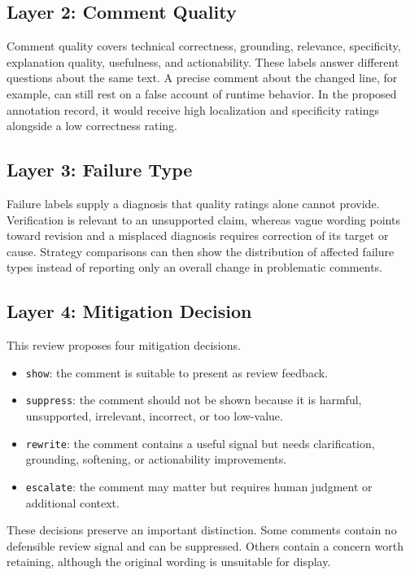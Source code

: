 \documentclass[10pt]{article}
\begin{document}
\subsection{Layer 2: Comment Quality}

Comment quality covers technical correctness, grounding, relevance, specificity, explanation quality, usefulness, and actionability. These labels answer different questions about the same text. A precise comment about the changed line, for example, can still rest on a false account of runtime behavior. In the proposed annotation record, it would receive high localization and specificity ratings alongside a low correctness rating.

\subsection{Layer 3: Failure Type}

Failure labels supply a diagnosis that quality ratings alone cannot provide. Verification is relevant to an unsupported claim, whereas vague wording points toward revision and a misplaced diagnosis requires correction of its target or cause. Strategy comparisons can then show the distribution of affected failure types instead of reporting only an overall change in problematic comments.

\subsection{Layer 4: Mitigation Decision}

This review proposes four mitigation decisions.

\begin{itemize}
\item \texttt{show}: the comment is suitable to present as review feedback.
\item \texttt{suppress}: the comment should not be shown because it is harmful, unsupported, irrelevant, incorrect, or too low-value.
\item \texttt{rewrite}: the comment contains a useful signal but needs clarification, grounding, softening, or actionability improvements.
\item \texttt{escalate}: the comment may matter but requires human judgment or additional context.
\end{itemize}

These decisions preserve an important distinction. Some comments contain no defensible review signal and can be suppressed. Others contain a concern worth retaining, although the original wording is unsuitable for display.
\end{document}
